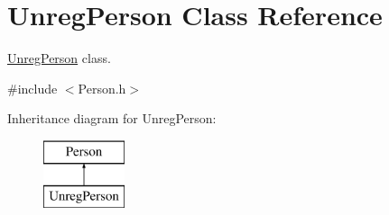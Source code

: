 \hypertarget{class_unreg_person}{\section{Unreg\+Person Class Reference}
\label{class_unreg_person}
}


\hyperlink{class_unreg_person}{Unreg\+Person} class.  




{\ttfamily \#include $<$Person.\+h$>$}

Inheritance diagram for Unreg\+Person\+:\begin{figure}[H]
\begin{center}
\leavevmode
\includegraphics[height=2.000000cm]{class_unreg_person}
\end{center}
\end{figure}
